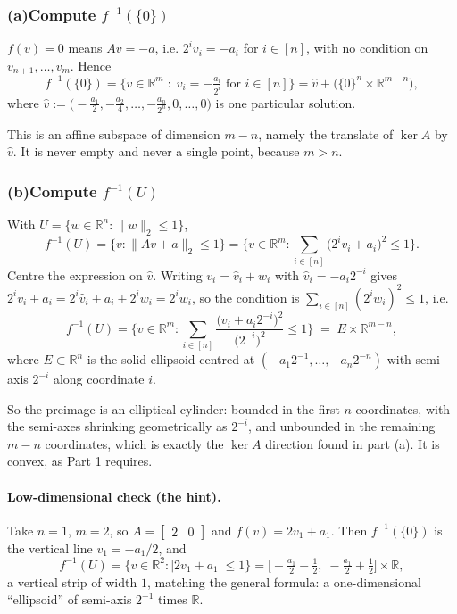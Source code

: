 \documentclass[11pt]{article}
\theoremstyle{definition}
\theoremstyle{plain}
\begin{document}
\subsubsection*{(a)\quad Compute $f^{-1}(\{0\})$}

$f(v) = 0$ means $Av = -a$, i.e. $2^i v_i = -a_i$ for $i \in [n]$, with
no condition on $v_{n+1},\dots,v_m$. Hence
\[
  \boxed{\;
  f^{-1}(\{0\})
  = \Big\{ v \in \mathbb{R}^m \;:\;
      v_i = -\tfrac{a_i}{2^i} \text{ for } i \in [n] \Big\}
  = \hat{v} + \big(\{0\}^n \times \mathbb{R}^{m-n}\big), \;}
\]
where $\hat{v} := \big(-\tfrac{a_1}{2}, -\tfrac{a_2}{4}, \dots,
-\tfrac{a_n}{2^n}, 0, \dots, 0\big)$ is one particular solution.

This is an affine subspace of dimension $m - n$, namely the translate of
$\ker A$ by $\hat{v}$. It is never empty and never a single point,
because $m > n$.

\subsubsection*{(b)\quad Compute $f^{-1}(U)$}

With $U = \{w \in \mathbb{R}^n : \|w\|_2 \le 1\}$,
\[
  f^{-1}(U)
  = \big\{ v : \|Av + a\|_2 \le 1 \big\}
  = \Big\{ v \in \mathbb{R}^m :
      \sum_{i \in [n]} \big( 2^i v_i + a_i \big)^2 \le 1 \Big\}.
\]
Centre the expression on $\hat{v}$. Writing $v_i = \hat{v}_i + w_i$ with
$\hat{v}_i = -a_i 2^{-i}$ gives
$2^i v_i + a_i = 2^i \hat{v}_i + a_i + 2^i w_i = 2^i w_i$, so the
condition is $\sum_{i \in [n]} (2^i w_i)^2 \le 1$, i.e.
\[
  \boxed{\;
  f^{-1}(U)
  = \Big\{ v \in \mathbb{R}^m :
      \sum_{i \in [n]}
      \frac{\big(v_i + a_i 2^{-i}\big)^2}{\big(2^{-i}\big)^2}
      \le 1 \Big\}
  \;=\; E \times \mathbb{R}^{m-n}, \;}
\]
where $E \subset \mathbb{R}^n$ is the solid ellipsoid centred at
$(-a_1 2^{-1}, \dots, -a_n 2^{-n})$ with semi-axis $2^{-i}$ along
coordinate $i$.

So the preimage is an elliptical cylinder: bounded in the first $n$
coordinates, with the semi-axes shrinking geometrically as $2^{-i}$, and
unbounded in the remaining $m-n$ coordinates, which is exactly the
$\ker A$ direction found in part (a). It is convex, as Part 1 requires.

\paragraph{Low-dimensional check (the hint).} Take $n = 1$, $m = 2$, so
$A = \begin{bmatrix} 2 & 0 \end{bmatrix}$ and
$f(v) = 2v_1 + a_1$. Then $f^{-1}(\{0\})$ is the vertical line
$v_1 = -a_1/2$, and
\[
  f^{-1}(U) = \{ v \in \mathbb{R}^2 : |2v_1 + a_1| \le 1 \}
            = \big[-\tfrac{a_1}{2} - \tfrac12,\;
                   -\tfrac{a_1}{2} + \tfrac12\big] \times \mathbb{R},
\]
a vertical strip of width $1$, matching the general formula: a
one-dimensional ``ellipsoid'' of semi-axis $2^{-1}$ times $\mathbb{R}$.
\end{document}
